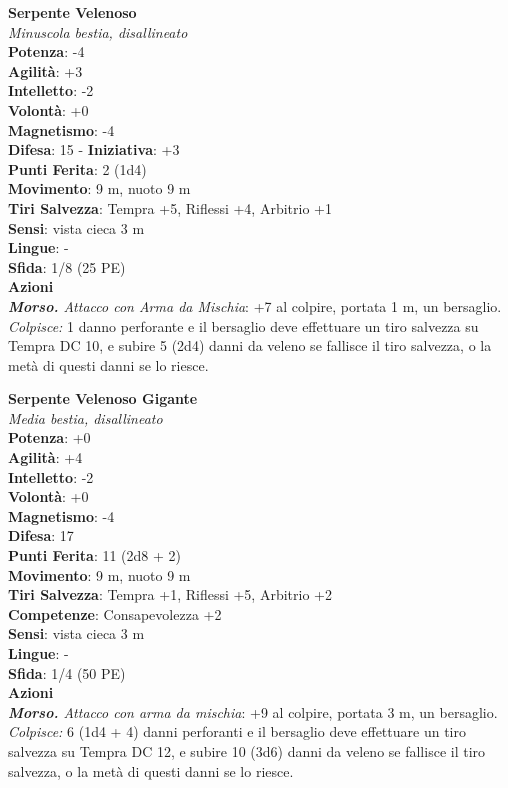 \begin{multicols}{2}
\medskip\textbf{Serpente Velenoso}\\
\emph{Minuscola bestia, disallineato}\\
\textbf{Potenza}: -4\\
\textbf{Agilità}: +3\\
\textbf{Intelletto}: -2\\
\textbf{Volontà}: +0\\
\textbf{Magnetismo}: -4\\
\textbf{Difesa}: 15 - \textbf{Iniziativa}: +3\\
\textbf{Punti Ferita}: 2 (1d4)\\
\textbf{Movimento}: 9 m, nuoto 9 m\\
\textbf{Tiri Salvezza}: Tempra +5, Riflessi +4, Arbitrio +1\\
\textbf{Sensi}: vista cieca 3 m\\
\textbf{Lingue}: -\\
\textbf{Sfida}: 1/8 (25 PE)\smallskip\\
\smallskip\textbf{Azioni}\\
\emph{\textbf{Morso.} Attacco con Arma da Mischia}: +7 al colpire, portata 1 m, un bersaglio.\\
\emph{Colpisce:} 1 danno perforante e il bersaglio deve effettuare un tiro salvezza su Tempra DC 10, e subire 5 (2d4) danni da veleno se fallisce il tiro salvezza, o la metà di questi danni se lo riesce.

\medskip\textbf{Serpente Velenoso Gigante}\\
\emph{Media bestia, disallineato}\\
\textbf{Potenza}: +0\\
\textbf{Agilità}: +4\\
\textbf{Intelletto}: -2\\
\textbf{Volontà}: +0\\
\textbf{Magnetismo}: -4\\
\textbf{Difesa}: 17\\
\textbf{Punti Ferita}: 11 (2d8 + 2)\\
\textbf{Movimento}: 9 m, nuoto 9 m\\
\textbf{Tiri Salvezza}: Tempra +1, Riflessi +5, Arbitrio +2\\
\textbf{Competenze}: Consapevolezza +2\\
\textbf{Sensi}: vista cieca 3 m\\
\textbf{Lingue}: -\\
\textbf{Sfida}: 1/4 (50 PE)\smallskip\\
\smallskip\textbf{Azioni}\\
\emph{\textbf{Morso.} Attacco con arma da mischia}: +9 al colpire, portata 3 m, un bersaglio.\\
\emph{Colpisce:} 6 (1d4 + 4) danni perforanti e il bersaglio deve effettuare un tiro salvezza su Tempra DC  12, e subire 10 (3d6) danni da veleno se fallisce il tiro salvezza, o la metà di questi danni se lo riesce.\\


\end{multicols}
